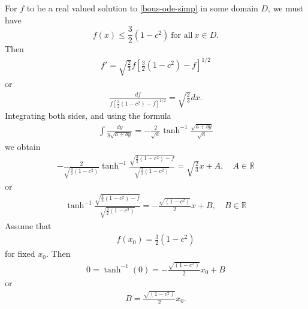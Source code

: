 \documentclass[12pt,reqno]{amsart}
\numberwithin{equation}{section}  %
\newcommand{\rr}{\mathbb{R}}
\begin{document}
%
%
For $f$ to be a real valued solution to \eqref{bous-ode-simp} in some domain
$D$, we must have $$f(x) \le \frac{3}{2}(1-c^{2}) \ \text{for all} \  x \in D.$$ 
%
%
Then
%
%
\begin{equation*}
\begin{split}
  f' = \sqrt{\frac{2}{3}}f \left[ \frac{3}{2}(1 - c^{2}) -f \right]^{1/2}
\end{split}
\end{equation*}
%
%
or
%
%
\begin{equation*}
\begin{split}
\frac{df}{ f \left[ \frac{3}{2}(1 - c^{2}) -f \right]^{1/2}} = \sqrt{\frac{2}{3}}
dx.
\end{split}
\end{equation*}
%
%
Integrating both sides, and using the formula
%
%
\begin{equation}
  \label{key-int-form}
\begin{split}
  \int \frac{dy}{y \sqrt{a + by}} = -\frac{2}{ \sqrt{a}} \tanh^{-1}
  \frac{\sqrt{a+ by}}{ \sqrt{a}}
\end{split}
\end{equation}
%
%
we obtain
%
%
\begin{equation*}
\begin{split}
  -\frac{2}{\sqrt{\frac{3}{2}(1-c^{2})}} \tanh^{-1}
  \frac{\sqrt{\frac{3}{2}(1-c^{2}) - f}}{\sqrt{\frac{3}{2}(1-c^{2})}} =
  \sqrt{\frac{2}{3}}x + A, \quad A \in \rr
\end{split}
\end{equation*}
%
%
or
\begin{equation*}
\begin{split}
  \tanh^{-1}
  \frac{\sqrt{\frac{3}{2}(1-c^{2}) - f}}{\sqrt{\frac{3}{2}(1-c^{2})}} =
  - \frac{\sqrt{(1-c^{2})}}{2}x + B, \quad B \in \rr
\end{split}
\end{equation*}
%
Assume that
%
%
\begin{equation*}
\begin{split}
  f(x_{0}) = \frac{3}{2}(1-c^{2})
\end{split}
\end{equation*}
%
%
for fixed $x_{0}$. Then
%
%
\begin{equation*}
\begin{split}
  0 = \tanh^{-1}(0) = - \frac{\sqrt{(1-c^{2})}}{2}x_{0} + B
\end{split}
\end{equation*}
%
%
or
%
%
\begin{equation*}
\begin{split}
B = \frac{\sqrt{(1-c^{2})}}{2}x_{0}.
\end{split}
\end{equation*}
\end{document}
